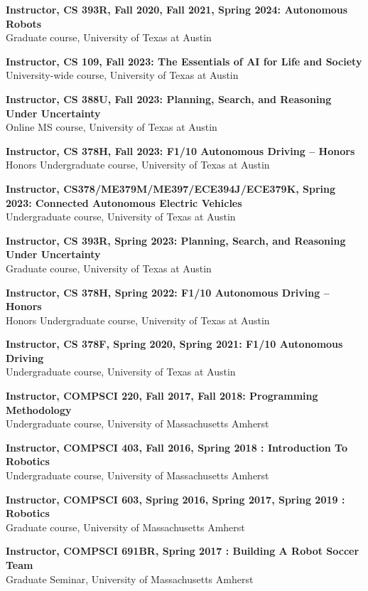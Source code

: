 \documentclass[Times]{article}
\begin{document}
{\bf Instructor, CS 393R, Fall 2020, Fall 2021, Spring 2024: Autonomous Robots}\\
Graduate course, University of Texas at Austin

{\bf Instructor, CS 109, Fall 2023: The Essentials of AI for Life and Society}\\
University-wide course, University of Texas at Austin

{\bf Instructor, CS 388U, Fall 2023: Planning, Search, and Reasoning Under Uncertainty}\\
Online MS course, University of Texas at Austin

{\bf Instructor, CS 378H, Fall 2023: F1/10 Autonomous Driving -- Honors}\\
Honors Undergraduate course, University of Texas at Austin

{\bf Instructor, CS378/ME379M/ME397/ECE394J/ECE379K, Spring 2023: Connected  Autonomous Electric  Vehicles}\\
Undergraduate course, University of Texas at Austin

{\bf Instructor, CS 393R, Spring 2023: Planning, Search, and Reasoning Under Uncertainty}\\
Graduate course, University of Texas at Austin

{\bf Instructor, CS 378H, Spring 2022: F1/10 Autonomous Driving -- Honors}\\
Honors Undergraduate course, University of Texas at Austin

{\bf Instructor, CS 378F, Spring 2020, Spring 2021: F1/10 Autonomous Driving}\\
Undergraduate course, University of Texas at Austin

{\bf Instructor, COMPSCI 220, Fall 2017, Fall 2018: Programming Methodology}\\
Undergraduate course, University of Massachusetts Amherst

{\bf Instructor, COMPSCI 403, Fall 2016, Spring 2018 : Introduction To
Robotics}\\
Undergraduate course, University of Massachusetts Amherst

{\bf Instructor, COMPSCI 603, Spring 2016, Spring 2017, Spring 2019 : Robotics}\\
\hfill Graduate course, University of Massachusetts Amherst

{\bf Instructor, COMPSCI 691BR, Spring 2017 : Building A Robot Soccer Team}\\
Graduate Seminar, University of Massachusetts Amherst
\end{document}
